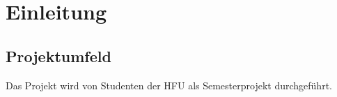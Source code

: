 \chapter{Einleitung}

\section{Projektumfeld}

Das Projekt wird von Studenten der HFU als Semesterprojekt durchgef\"uhrt.
